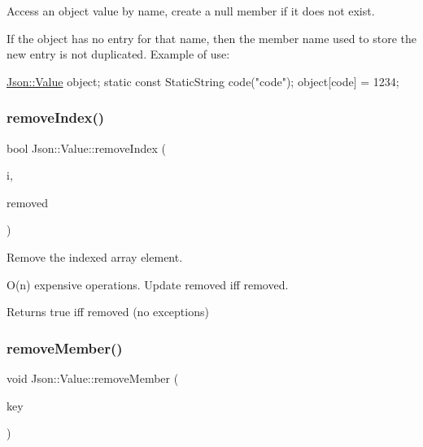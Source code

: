 Access an object value by name, create a null member if it does not exist. 

If the object has no entry for that name, then the member name used to store the new entry is not duplicated. Example of use\+: 
\begin{DoxyCode}
\hyperlink{classJson_1_1Value}{Json::Value} object;
\textcolor{keyword}{static} \textcolor{keyword}{const} StaticString code(\textcolor{stringliteral}{"code"});
\textcolor{keywordtype}{object}[code] = 1234;
\end{DoxyCode}
 \mbox{\label{classJson_1_1Value_ae9e67e08a85a2f3be3396ec0f4c47f65}} 
\subsubsection{\texorpdfstring{remove\+Index()}{removeIndex()}}
{\footnotesize\ttfamily bool Json\+::\+Value\+::remove\+Index (\begin{DoxyParamCaption}\item[{Array\+Index}]{i,  }\item[{\hyperlink{classJson_1_1Value}{Value} $\ast$}]{removed }\end{DoxyParamCaption})}



Remove the indexed array element. 

O(n) expensive operations. Update \textquotesingle{}removed\textquotesingle{} iff removed. \begin{DoxyReturn}{Returns}
true iff removed (no exceptions) 
\end{DoxyReturn}
\mbox{\label{classJson_1_1Value_a92e165f04105d27a930fb3a18a053585}} 
\subsubsection{\texorpdfstring{remove\+Member()}{removeMember()}\hspace{0.1cm}{\footnotesize\ttfamily [1/4]}}
{\footnotesize\ttfamily void Json\+::\+Value\+::remove\+Member (\begin{DoxyParamCaption}\item[{const char $\ast$}]{key }\end{DoxyParamCaption})}



